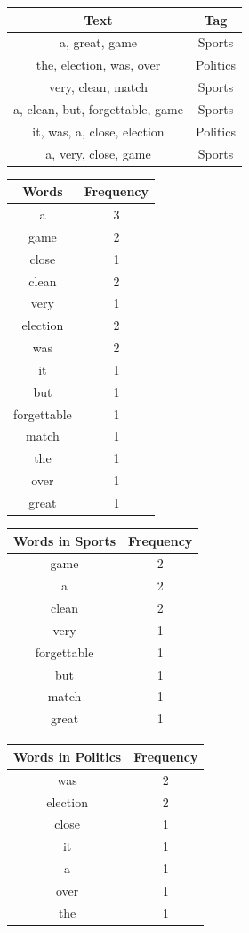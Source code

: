 \documentclass[12pt,twoside]{report}   %
\begin{document}
\begin{table}[H]
  \centering
  \begin{tabular}{|c|c|}
    \hline
    Text & Tag\\
\hline
a, great, game & Sports\\
the, election, was, over & Politics\\ 
very, clean, match & Sports\\
a, clean, but, forgettable, game & Sports\\
it, was, a, close, election & Politics\\
a, very, close, game & Sports\\
\hline
  \end{tabular}
\end{table}
\begin{table}[H]
  \centering
  \begin{tabular}{|c|c|}
    \hline
    Words & Frequency\\
\hline
a & 3\\
game & 2\\
close & 1\\
clean & 2\\
very & 1\\
election & 2\\
was & 2\\
it & 1\\
but & 1\\
forgettable & 1\\
match & 1\\
the & 1\\
over & 1\\
great & 1\\
\hline
  \end{tabular}
  \quad
  \begin{tabular}{|c|c|}
    \hline
    Words in Sports & Frequency\\
\hline
game & 2\\
a & 2\\
clean & 2\\
very & 1\\
forgettable & 1\\
but & 1\\
match & 1\\
great & 1\\
\hline
  \end{tabular}
\end{table}
\begin{table}[H]
  \centering
  \begin{tabular}{|c|c|}
    \hline
    Words in Politics & Frequency\\
\hline
was & 2\\
election & 2\\
close & 1\\
it & 1\\
a & 1\\
over & 1\\
the & 1\\
\hline
  \end{tabular}
\end{table}
\end{document}
